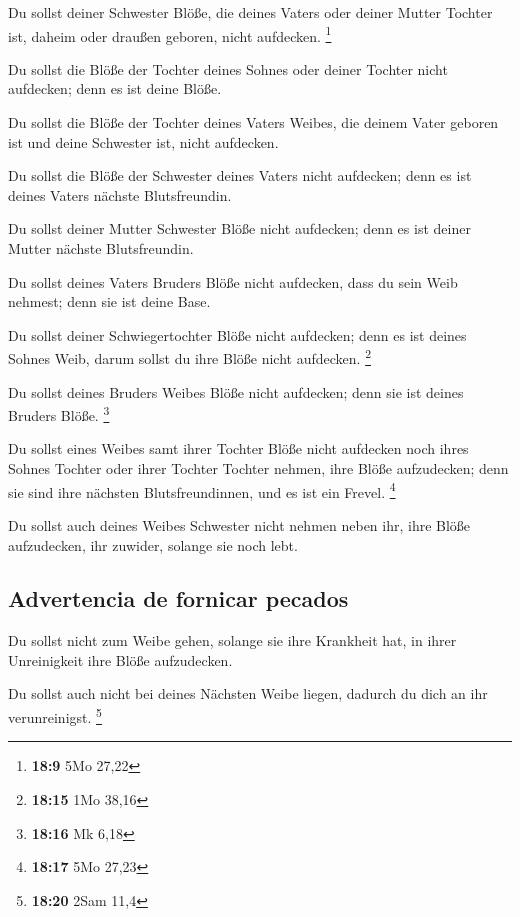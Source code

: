  Du sollst deiner Schwester Blöße, die deines Vaters oder
deiner Mutter Tochter ist, daheim oder draußen geboren, nicht aufdecken.
\footnote{\textbf{18:9} 5Mo 27,22}

 Du sollst die Blöße der Tochter deines Sohnes oder
deiner Tochter nicht aufdecken; denn es ist deine Blöße.

 Du sollst die Blöße der Tochter deines Vaters Weibes,
die deinem Vater geboren ist und deine Schwester ist, nicht aufdecken.

 Du sollst die Blöße der Schwester deines Vaters nicht
aufdecken; denn es ist deines Vaters nächste Blutsfreundin.

 Du sollst deiner Mutter Schwester Blöße nicht aufdecken;
denn es ist deiner Mutter nächste Blutsfreundin.

 Du sollst deines Vaters Bruders Blöße nicht aufdecken,
dass du sein Weib nehmest; denn sie ist deine Base.

 Du sollst deiner Schwiegertochter Blöße nicht aufdecken;
denn es ist deines Sohnes Weib, darum sollst du ihre Blöße nicht
aufdecken. \footnote{\textbf{18:15} 1Mo 38,16}

 Du sollst deines Bruders Weibes Blöße nicht aufdecken;
denn sie ist deines Bruders Blöße. \footnote{\textbf{18:16} Mk 6,18}

 Du sollst eines Weibes samt ihrer Tochter Blöße nicht
aufdecken noch ihres Sohnes Tochter oder ihrer Tochter Tochter nehmen,
ihre Blöße aufzudecken; denn sie sind ihre nächsten Blutsfreundinnen,
und es ist ein Frevel. \footnote{\textbf{18:17} 5Mo 27,23}

 Du sollst auch deines Weibes Schwester nicht nehmen
neben ihr, ihre Blöße aufzudecken, ihr zuwider, solange sie noch lebt.

\hypertarget{advertencia-de-fornicar-pecados}{%
\subsection{Advertencia de fornicar
pecados}\label{advertencia-de-fornicar-pecados}}

 Du sollst nicht zum Weibe gehen, solange sie ihre
Krankheit hat, in ihrer Unreinigkeit ihre Blöße aufzudecken.

 Du sollst auch nicht bei deines Nächsten Weibe liegen,
dadurch du dich an ihr verunreinigst. \footnote{\textbf{18:20} 2Sam 11,4}

